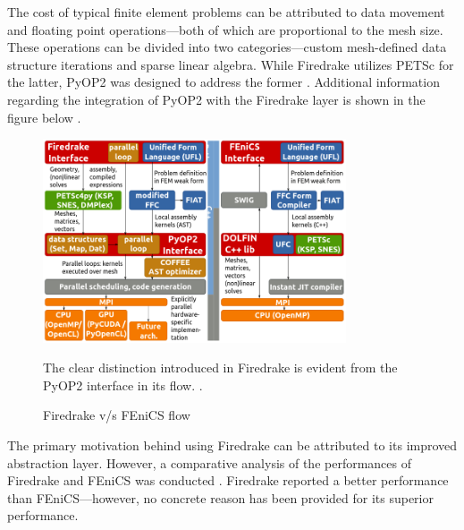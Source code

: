The cost of typical finite element problems can be attributed to data movement and floating point operations---both of which are proportional to the mesh size. These operations can be divided into two categories---custom mesh-defined data structure iterations and sparse linear algebra. While Firedrake utilizes PETSc \cite{balay2001petsc} for the latter, PyOP2 was designed to address the former \cite{rathgeber2012pyop2}. Additional information regarding the integration of PyOP2 with the Firedrake layer is shown in the figure below \cite{rathgeber2016firedrake}.
\begin{figure}[th]
        \centering
        \includegraphics[width=0.8\textwidth]{figures/firedrake_toolchain_dolfin.png}
        \caption{Firedrake v/s FEniCS flow}The clear distinction introduced in Firedrake is evident from the PyOP2 interface in its flow. \cite{rathgeber2014firedrake}.
        \label{figure:parameter}
        \end{figure}

The primary motivation behind using Firedrake can be attributed to its improved abstraction layer. However, a comparative analysis of the performances of Firedrake and FEniCS was conducted \cite{rathgeber2016firedrake}. Firedrake reported a better performance than FEniCS---however, no concrete reason has been provided for its superior performance.


